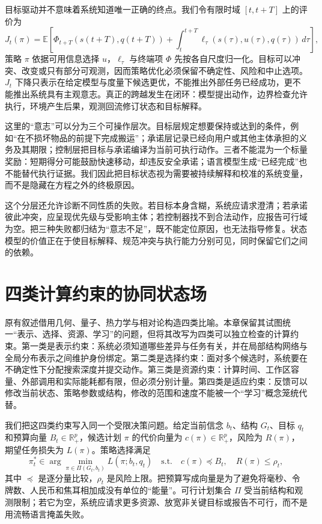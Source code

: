 目标驱动并不意味着系统知道唯一正确的终点。我们令有限时域 $[t,t+T]$ 上的评价为
\begin{equation}
  J_t(\pi)=\mathbb E\!\left[
  \Phi_{t+T}(s(t+T),q(t+T))+
  \int_t^{t+T}\ell_\tau(s(\tau),u(\tau),q(\tau))\,d\tau
  \right],
\end{equation}
策略 $\pi$ 依据可用信息选择 $u$，$\ell_\tau$ 与终端项 $\Phi$ 先按各自尺度归一化。目标可以冲突、改变或只有部分可观测，因而策略优化必须保留不确定性、风险和中止选项。$J_t$ 下降只表示在给定模型与度量下候选更优，不能推出外部任务已经成功，更不能推出系统具有主观意志。真正的跨越发生在闭环：模型提出动作，边界检查允许执行，环境产生后果，观测回流修订状态和目标解释。

这里的“意志”可以分为三个可操作层次。目标层规定想要保持或达到的条件，例如“在不损坏物品的前提下完成搬运”；承诺层记录已经向用户或其他主体承担的义务及其期限；控制层把目标与承诺编译为当前可执行动作。三者不能混为一个标量奖励：短期得分可能鼓励快速移动，却违反安全承诺；语言模型生成“已经完成”也不能替代执行证据。我们因此把目标状态视为需要被持续解释和校准的系统变量，而不是隐藏在方程之外的终极原因。

这个分层还允许诊断不同性质的失败。若目标本身含糊，系统应请求澄清；若承诺彼此冲突，应呈现优先级与受影响主体；若控制器找不到合法动作，应报告可行域为空。把三种失败都归结为“意志不足”，既不能定位原因，也无法指导修复。状态模型的价值正在于使目标解释、规范冲突与执行能力分别可见，同时保留它们之间的依赖。

\section{四类计算约束的协同状态场}
\label{sec:section_6723}

原有叙述借用几何、量子、热力学与相对论构造四类比喻。本章保留其试图统一“表示、选择、资源、学习”的问题，但将其改写为四类可以独立检查的计算约束。第一类是表示约束：系统必须知道哪些差异与任务有关，并在局部结构网络与全局分布表示之间维护身份绑定。第二类是选择约束：面对多个候选时，系统要在不确定性下分配搜索深度并提交动作。第三类是资源约束：计算时间、工作区容量、外部调用和实际能耗都有限，但必须分别计量。第四类是适应约束：反馈可以修改当前状态、策略参数或结构，修改的范围和速度不能被一个“学习”概念笼统代替。

我们把这四类约束写入同一个受限决策问题。给定当前信念 $b_t$、结构 $G_t$、目标 $q_t$ 和预算向量 $B_t\in\mathbb R_+^p$，候选计划 $\pi$ 的代价向量为 $c(\pi)\in\mathbb R_+^p$，风险为 $R(\pi)$，期望任务损失为 $L(\pi)$。策略选择满足
\begin{equation}
  \pi_t^*\in\arg\min_{\pi\in\Pi(G_t,b_t)}L(\pi;b_t,q_t)
  \quad\text{s.t.}\quad c(\pi)\preceq B_t,
  \quad R(\pi)\le\rho_t,
\end{equation}
其中 $\preceq$ 是逐分量比较，$\rho_t$ 是风险上限。把预算写成向量是为了避免将毫秒、令牌数、人民币和焦耳相加成没有单位的“能量”。可行计划集合 $\Pi$ 受当前结构和观测限制；若它为空，系统应请求更多资源、放宽非关键目标或报告不可行，而不是用流畅语言掩盖失败。

